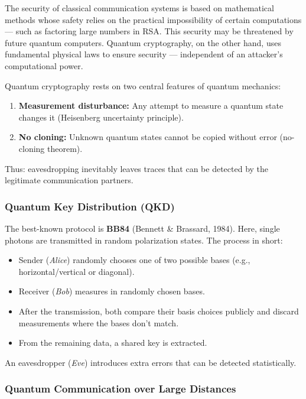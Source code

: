 The security of classical communication systems is based on mathematical methods whose safety relies on the practical impossibility of certain computations — such as factoring large numbers in RSA. This security may be threatened by future quantum computers.  
Quantum cryptography, on the other hand, uses fundamental physical laws to ensure security — independent of an attacker’s computational power.
\vspace{1em}
\begin{tcolorbox}[physikbox, title=Core Principle of Quantum Cryptography \label{box:qcrypto_prinzip}]
	\small
	Quantum cryptography rests on two central features of quantum mechanics:
	\begin{enumerate}
		\item \textbf{Measurement disturbance:} Any attempt to measure a quantum state changes it (Heisenberg uncertainty principle).
		\item \textbf{No cloning:} Unknown quantum states cannot be copied without error (no-cloning theorem).
	\end{enumerate}
	Thus: eavesdropping inevitably leaves traces that can be detected by the legitimate communication partners.
\end{tcolorbox}
\newpage
\noindent
\subsubsection{Quantum Key Distribution (QKD)}

The best-known protocol is \textbf{BB84} (Bennett \& Brassard, 1984). Here, single photons are transmitted in random polarization states.  
The process in short:
\begin{itemize}
	\item Sender (\emph{Alice}) randomly chooses one of two possible bases (e.g., horizontal/vertical or diagonal).
	\item Receiver (\emph{Bob}) measures in randomly chosen bases.
	\item After the transmission, both compare their basis choices publicly and discard measurements where the bases don’t match.
	\item From the remaining data, a shared key is extracted.
\end{itemize}
An eavesdropper (\emph{Eve}) introduces extra errors that can be detected statistically.

\subsubsection{Quantum Communication over Large Distances}

